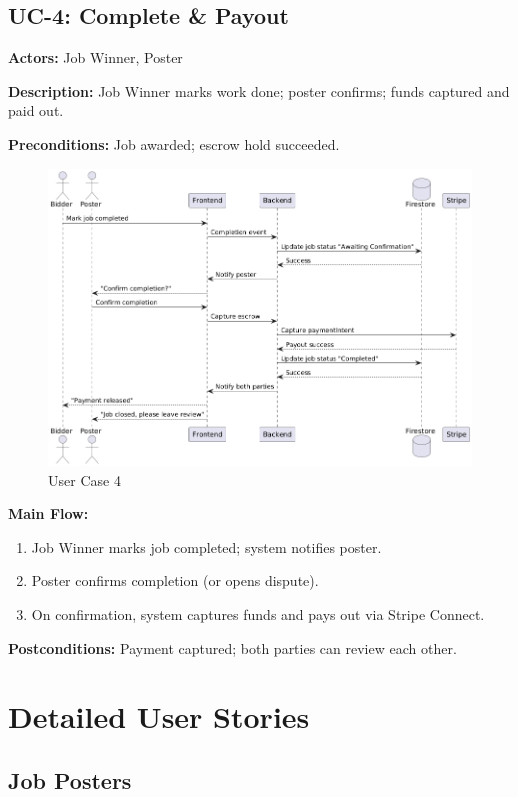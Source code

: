 \documentclass[11pt]{article}
\begin{document}
\subsection{UC-4: Complete \& Payout}
\textbf{Actors:} Job Winner, Poster \par
\textbf{Description:} Job Winner marks work done; poster confirms; funds captured and paid out.\par
\textbf{Preconditions:} Job awarded; escrow hold succeeded.\par
\begin{figure}[h]
  \centering
\includegraphics[width=0.9\linewidth]{UC-4.png}
  \caption{User Case 4}
\end{figure} \par
\textbf{Main Flow:}
\begin{enumerate}[leftmargin=1.4em]
  \item Job Winner marks job completed; system notifies poster.
  \item Poster confirms completion (or opens dispute).
  \item On confirmation, system captures funds and pays out via Stripe Connect.
\end{enumerate}
\textbf{Postconditions:} Payment captured; both parties can review each other.

\section{Detailed User Stories}

\subsection*{Job Posters}
\end{document}

